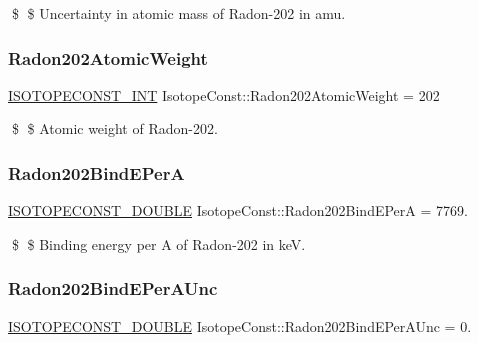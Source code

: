 \$ \$ Uncertainty in atomic mass of Radon-\/202 in amu. \mbox{\label{group___isotope_const-_radon-_rn202_ga5f464592cc5a4fc36885c0a6f62410df}} 
\subsubsection{\texorpdfstring{Radon202\+Atomic\+Weight}{Radon202AtomicWeight}}
{\footnotesize\ttfamily \mbox{\hyperlink{group___isotope_const-_macros_ga5f18360b3e99483a35c32d789e62621c}{I\+S\+O\+T\+O\+P\+E\+C\+O\+N\+S\+T\+\_\+\+I\+NT}} Isotope\+Const\+::\+Radon202\+Atomic\+Weight = 202}

\$ \$ Atomic weight of Radon-\/202. \mbox{\label{group___isotope_const-_radon-_rn202_ga799af607e335b08adb11b726492d4a4d}} 
\subsubsection{\texorpdfstring{Radon202\+Bind\+E\+PerA}{Radon202BindEPerA}}
{\footnotesize\ttfamily \mbox{\hyperlink{group___isotope_const-_macros_ga8f45a7272ce02c0b4c65c44636ed719a}{I\+S\+O\+T\+O\+P\+E\+C\+O\+N\+S\+T\+\_\+\+D\+O\+U\+B\+LE}} Isotope\+Const\+::\+Radon202\+Bind\+E\+PerA = 7769.}

\$ \$ Binding energy per A of Radon-\/202 in keV. \mbox{\label{group___isotope_const-_radon-_rn202_ga1a54f80a4fa1d668677272e8c03c4aa1}} 
\subsubsection{\texorpdfstring{Radon202\+Bind\+E\+Per\+A\+Unc}{Radon202BindEPerAUnc}}
{\footnotesize\ttfamily \mbox{\hyperlink{group___isotope_const-_macros_ga8f45a7272ce02c0b4c65c44636ed719a}{I\+S\+O\+T\+O\+P\+E\+C\+O\+N\+S\+T\+\_\+\+D\+O\+U\+B\+LE}} Isotope\+Const\+::\+Radon202\+Bind\+E\+Per\+A\+Unc = 0.}

